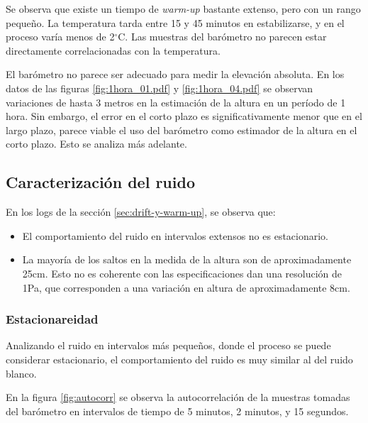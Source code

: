 \documentclass[main]{subfiles}
\newcommand{\degc}{$^\circ$C}
\begin{document}

Se observa que existe un tiempo de \textit{warm-up} bastante extenso, pero con un rango pequeño. La temperatura tarda entre 15 y 45 minutos en estabilizarse, y en el proceso varía menos de 2\degc. Las muestras del barómetro no parecen estar directamente correlacionadas con la temperatura.

El barómetro no parece ser adecuado para medir la elevación absoluta. En los datos de las figuras \ref{fig:1hora_01.pdf} y \ref{fig:1hora_04.pdf} se observan variaciones de hasta 3 metros en la estimación de la altura en un período de 1 hora. Sin embargo, el error en el corto plazo es significativamente menor que en el largo plazo, parece viable el uso del barómetro como estimador de la altura en el corto plazo. Esto se analiza más adelante.

\newpage
\subsection{Caracterización del ruido}
\label{sec:caract-ruido}

En los logs de la sección \ref{sec:drift-y-warm-up}, se observa que:
\begin{itemize}
\item El comportamiento del ruido en intervalos extensos no es estacionario.
\item La mayoría de los saltos en la medida de la altura son de aproximadamente 25cm. Esto no es coherente con las especificaciones dan una resolución de 1Pa, que corresponden a una variación en altura de aproximadamente 8cm.
\end{itemize}

\subsubsection{Estacionareidad}

Analizando el ruido en intervalos más pequeños, donde el proceso se puede considerar estacionario, el comportamiento del ruido es muy similar al del ruido blanco.

En la figura \ref{fig:autocorr} se observa la autocorrelación de la muestras tomadas del barómetro en intervalos de tiempo de 5 minutos, 2 minutos, y 15 segundos.
\end{document}

